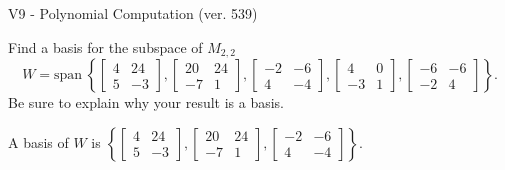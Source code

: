 \begin{exercise}
  \begin{exerciseTitle}V9 - Polynomial Computation (ver. 539)\end{exerciseTitle}
  \begin{exerciseStatement}
    Find a basis for the subspace of \(M_{2,2}\) 
\[W=\mathrm{span}\ \left\{\left[\begin{array}{cc}
4 & 24 \\
5 & -3
\end{array}\right] , \left[\begin{array}{cc}
20 & 24 \\
-7 & 1
\end{array}\right] , \left[\begin{array}{cc}
-2 & -6 \\
4 & -4
\end{array}\right] , \left[\begin{array}{cc}
4 & 0 \\
-3 & 1
\end{array}\right] , \left[\begin{array}{cc}
-6 & -6 \\
-2 & 4
\end{array}\right]\right\}.\]
 Be sure to explain why your result is a basis.


  \end{exerciseStatement}
  \begin{exerciseAnswer}
   A basis of \(W\) is  \(\left\{\left[\begin{array}{cc}
4 & 24 \\
5 & -3
\end{array}\right] , \left[\begin{array}{cc}
20 & 24 \\
-7 & 1
\end{array}\right] , \left[\begin{array}{cc}
-2 & -6 \\
4 & -4
\end{array}\right]\right\}\).
  


  \end{exerciseAnswer}
\end{exercise}